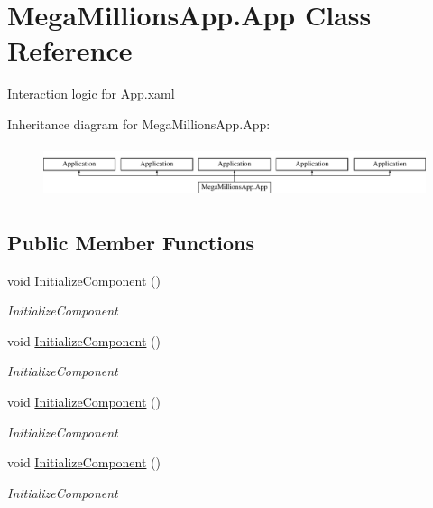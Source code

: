 \hypertarget{class_mega_millions_app_1_1_app}{}\section{Mega\+Millions\+App.\+App Class Reference}
\label{class_mega_millions_app_1_1_app}


Interaction logic for App.\+xaml  


Inheritance diagram for Mega\+Millions\+App.\+App\+:\begin{figure}[H]
\begin{center}
\leavevmode
\includegraphics[height=1.544828cm]{class_mega_millions_app_1_1_app}
\end{center}
\end{figure}
\subsection*{Public Member Functions}
\begin{DoxyCompactItemize}
\item 
void \hyperlink{class_mega_millions_app_1_1_app_ac958e0f1d80a00103e51f8f1cec8dbd2}{Initialize\+Component} ()
\begin{DoxyCompactList}\small\item\em Initialize\+Component \end{DoxyCompactList}\item 
void \hyperlink{class_mega_millions_app_1_1_app_ac958e0f1d80a00103e51f8f1cec8dbd2}{Initialize\+Component} ()
\begin{DoxyCompactList}\small\item\em Initialize\+Component \end{DoxyCompactList}\item 
void \hyperlink{class_mega_millions_app_1_1_app_ac958e0f1d80a00103e51f8f1cec8dbd2}{Initialize\+Component} ()
\begin{DoxyCompactList}\small\item\em Initialize\+Component \end{DoxyCompactList}\item 
void \hyperlink{class_mega_millions_app_1_1_app_ac958e0f1d80a00103e51f8f1cec8dbd2}{Initialize\+Component} ()
\begin{DoxyCompactList}\small\item\em Initialize\+Component \end{DoxyCompactList}\end{DoxyCompactItemize}
